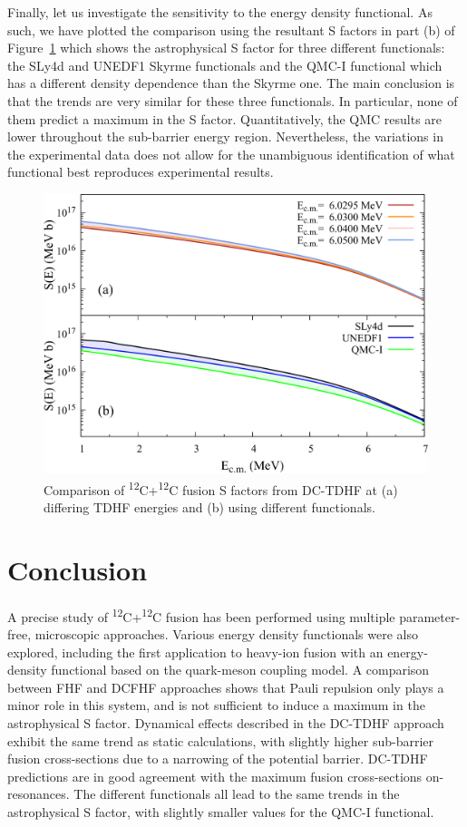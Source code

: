 Finally, let us investigate the sensitivity to the energy density functional. 
As such, we have plotted the comparison using the resultant S factors in part (b) of Figure~\ref{fig:sfaccomp} which shows the astrophysical S factor for three different functionals: the SLy4d \protect\citep{kim1997} and UNEDF1 \protect\citep{kortelainen2012} Skyrme functionals and the QMC-I functional which has a different density dependence than the Skyrme one. 
The main conclusion is that the trends are very similar for these three functionals. In particular, none of them predict a maximum in the S factor. 
Quantitatively, the QMC results are lower throughout the sub-barrier energy region.
Nevertheless, the variations in the experimental data does not allow for the unambiguous identification of what functional best reproduces experimental results.

\begin{figure}
	\includegraphics*[width=\textwidth]{../Figures/CC/SFactorsComp.pdf}
	\caption{Comparison of \textsuperscript{12}C+\textsuperscript{12}C fusion S factors from DC-TDHF at (a) differing TDHF energies and (b) using different functionals.}
	\label{fig:sfaccomp}
\end{figure}


\section{Conclusion}
\label{cc:sec:conclusion}
A precise study of \textsuperscript{12}C+\textsuperscript{12}C fusion has been performed using multiple parameter-free, microscopic approaches. 
Various energy density functionals were also explored, including the first application to heavy-ion fusion with an energy-density functional based on the quark-meson coupling model.
A comparison between FHF and DCFHF approaches shows that Pauli repulsion only plays a minor role in this system, and is not sufficient to induce a maximum in the astrophysical S factor. 
Dynamical effects described in the DC-TDHF approach exhibit the same trend as static calculations, with slightly higher sub-barrier fusion cross-sections due to a narrowing of the potential barrier. 
DC-TDHF predictions are in good agreement with the maximum fusion cross-sections on-resonances. 
The different functionals all lead to the same trends in the astrophysical S factor, with slightly smaller values for the QMC-I functional. 


